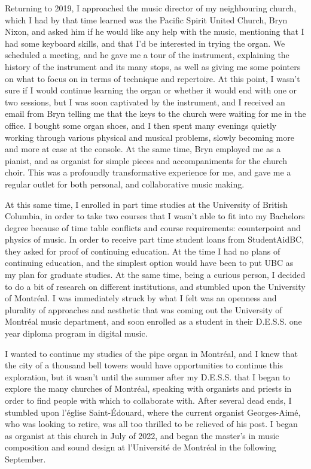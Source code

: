 \documentclass[12pt,twoside,maitrise]{dms}
\theoremstyle{definition}
\begin{document}
Returning to 2019, I approached the music director of my neighbouring church, which I had by that time learned was the Pacific Spirit United Church, Bryn Nixon, and asked him if he would like any help with the music, mentioning that I had some keyboard skills, and that I’d be interested in trying the organ.
We scheduled a meeting, and he gave me a tour of the instrument, explaining the history of the instrument and its many stops, as well as giving me some pointers on what to focus on in terms of technique and repertoire.
At this point, I wasn’t sure if I would continue learning the organ or whether it would end with one or two sessions, but I was soon captivated by the instrument, and I received an email from Bryn telling me that the keys to the church were waiting for me in the office.
I bought some organ shoes, and I then spent many evenings quietly working through various physical and musical problems, slowly becoming more and more at ease at the console.
At the same time, Bryn employed me as a pianist, and as organist for simple pieces and accompaniments for the church choir.
This was a profoundly transformative experience for me, and gave me a regular outlet for both personal, and collaborative music making.


At this same time, I enrolled in part time studies at the University of British Columbia, in order to take two courses that I wasn’t able to fit into my Bachelors degree because of time table conflicts and course requirements: counterpoint and physics of music.
In order to receive part time student loans from StudentAidBC, they asked for proof of continuing education.
At the time I had no plans of continuing education, and the simplest option would have been to put UBC as my plan for graduate studies.
At the same time, being a curious person, I decided to do a bit of research on different institutions, and stumbled upon the University of Montréal.
I was immediately struck by what I felt was an openness and plurality of approaches and aesthetic that was coming out the University of Montréal music department, and soon enrolled as a student in their D.E.S.S.
one year diploma program in digital music.


I wanted to continue my studies of the pipe organ in Montréal, and I knew that the city of a thousand bell towers would have opportunities to continue this exploration, but it wasn’t until the summer after my D.E.S.S.
that I began to explore the many churches of Montréal, speaking with organists and priests in order to find people with which to collaborate with.
After several dead ends, I stumbled upon l’église Saint-Édouard, where the current organist Georges-Aimé, who was looking to retire, was all too thrilled to be relieved of his post.
I began as organist at this church in July of 2022, and began the master’s in music composition and sound design at l’Université de Montréal in the following September.
\end{document}
